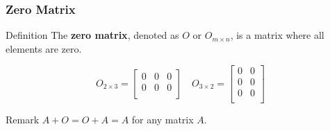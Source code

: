 \documentclass{beamer}
\begin{document}
\begin{frame}
  \frametitle{Zero Matrix}

  \begin{block}{Definition}
    The \textbf{zero matrix}, denoted as \(O\) or \(O_{m \times n}\), is a matrix where all elements are zero.
  \end{block}

  \pause

  \begin{example}
    \[
      O_{2 \times 3} = \begin{bmatrix}
        0 & 0 & 0 \\
        0 & 0 & 0 \\
      \end{bmatrix}
      \quad
      O_{3 \times 2} = \begin{bmatrix}
        0 & 0 \\
        0 & 0 \\
        0 & 0 \\
      \end{bmatrix}
    \]
  \end{example}

  \pause

  \begin{block}{Remark}
    \(A + O=O+A= A\) for any matrix \(A\).
  \end{block}

\end{frame}
\end{document}
